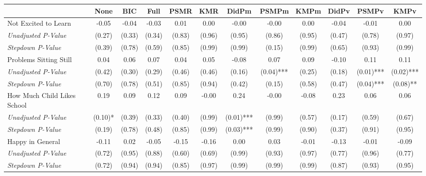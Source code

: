 \begin{tabular}{l c c c c c c c c c c c}
\toprule
 & None & BIC & Full & PSMR & KMR & DidPm & PSMPm & KMPm & DidPv & PSMPv & KMPv \\
\midrule
Not Excited to Learn & -0.05 & -0.04 & -0.03 & 0.01 & 0.00 & -0.00 & -0.00 & 0.00 & -0.04 & -0.01 & 0.00 \\
\quad \textit{Unadjusted P-Value} & (0.27) & (0.33) & (0.34) & (0.83) & (0.96) & (0.95) & (0.86) & (0.95) & (0.47) & (0.78) & (0.97) \\
\quad \textit{Stepdown P-Value} & (0.39) & (0.78) & (0.59) & (0.85) & (0.99) & (0.99) & (0.15) & (0.99) & (0.65) & (0.93) & (0.99) \\
Problems Sitting Still & 0.04 & 0.06 & 0.07 & 0.04 & 0.05 & -0.08 & 0.07 & 0.09 & -0.10 & 0.11 & 0.11 \\
\quad \textit{Unadjusted P-Value} & (0.42) & (0.30) & (0.29) & (0.46) & (0.46) & (0.16) & (0.04)*** & (0.25) & (0.18) & (0.01)*** & (0.02)*** \\
\quad \textit{Stepdown P-Value} & (0.70) & (0.78) & (0.51) & (0.85) & (0.94) & (0.42) & (0.15) & (0.58) & (0.47) & (0.04)*** & (0.08)** \\
How Much Child Likes School & 0.19 & 0.09 & 0.12 & 0.09 & -0.00 & 0.24 & -0.00 & -0.08 & 0.23 & 0.06 & 0.06 \\
\quad \textit{Unadjusted P-Value} & (0.10)* & (0.39) & (0.33) & (0.40) & (0.99) & (0.01)*** & (0.99) & (0.57) & (0.17) & (0.59) & (0.67) \\
\quad \textit{Stepdown P-Value} & (0.19) & (0.78) & (0.48) & (0.85) & (0.99) & (0.03)*** & (0.99) & (0.90) & (0.37) & (0.91) & (0.95) \\
Happy in General & -0.11 & 0.02 & -0.05 & -0.15 & -0.16 & 0.00 & 0.03 & -0.01 & -0.13 & -0.01 & -0.09 \\
\quad \textit{Unadjusted P-Value} & (0.72) & (0.95) & (0.88) & (0.60) & (0.69) & (0.99) & (0.93) & (0.97) & (0.77) & (0.96) & (0.77) \\
\quad \textit{Stepdown P-Value} & (0.72) & (0.94) & (0.94) & (0.85) & (0.97) & (0.99) & (0.99) & (0.99) & (0.87) & (0.93) & (0.95) \\
\bottomrule
\end{tabular}
